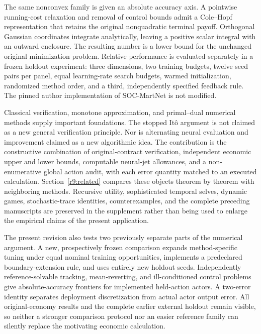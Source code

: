 The same nonconvex family is given an absolute accuracy axis. A pointwise running-cost relaxation and removal of control bounds admit a Cole--Hopf representation that retains the original nonquadratic terminal payoff. Orthogonal Gaussian coordinates integrate analytically, leaving a positive scalar integral with an outward enclosure. The resulting number is a lower bound for the unchanged original minimization problem. Relative performance is evaluated separately in a frozen holdout experiment: three dimensions, two training budgets, twelve seed pairs per panel, equal learning-rate search budgets, warmed initialization, randomized method order, and a third, independently specified feedback rule. The pinned author implementation of SOC-MartNet is not modified.

Classical verification, monotone approximation, and primal--dual numerical methods supply important foundations. The stopped It\^o argument is not claimed as a new general verification principle. Nor is alternating neural evaluation and improvement claimed as a new algorithmic idea. The contribution is the constructive combination of original-contract verification, independent economic upper and lower bounds, computable neural-jet allowances, and a non-enumerative global action audit, with each error quantity matched to an executed calculation. Section~\ref{r9:related} compares these objects theorem by theorem with neighboring methods. Recursive utility, sophisticated temporal selves, dynamic games, stochastic-trace identities, counterexamples, and the complete preceding manuscripts are preserved in the supplement rather than being used to enlarge the empirical claims of the present application.


The present revision also tests two previously separate parts of the numerical argument. A new, prospectively frozen comparison expands method-specific tuning under equal nominal training opportunities, implements a predeclared boundary-extension rule, and uses entirely new holdout seeds. Independently reference-solvable tracking, mean-reverting, and ill-conditioned control problems give absolute-accuracy frontiers for implemented held-action actors. A two-error identity separates deployment discretization from actual actor output error. All original-economy results and the complete earlier external holdout remain visible, so neither a stronger comparison protocol nor an easier reference family can silently replace the motivating economic calculation.

